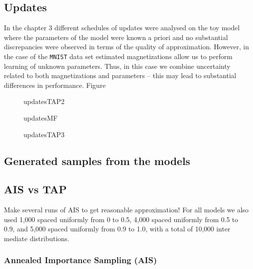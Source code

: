 \documentclass[../report/report.tex]{subfiles}
\begin{document}
\subsection{Updates }
In the chapter $3$ different schedules of updates were analysed on the toy model where the parameters of the model were known a priori and no substantial discrepancies were observed in terms of the quality of approximation. 
However, in the case of the \verb|MNIST| data set estimated magnetizations allow us to perform learning of unknown parameters. Thus, in this case we combine uncertainty related to both magnetizations and parameters -- this may lead to substantial differences in performance. Figure 

\begin{figure}[!htb]
\label{fig:updatesTAP2}
  \caption[1]{updatesTAP2}
\end{figure}

\begin{figure}[!htb]
\label{fig:updatesMF}
  \caption[1]{updatesMF}
\end{figure}

\begin{figure}[!htb]
\label{fig:updatesTAP3}
  \caption[1]{updatesTAP3}
\end{figure}

\subsection{Generated samples from the models}

\subsection{AIS vs TAP}
Make several runs of AIS to get reasonable approximation!
For  all  models  we  also  used  1,000
spaced  uniformly  from  0  to  0.5,  4,000
spaced  uniformly
from 0.5 to 0.9,  and 5,000
spaced uniformly from 0.9 to 1.0,  with a total of 10,000 inter
mediate
distributions. 

\subsubsection{Annealed Importance Sampling (AIS)}
\end{document}
